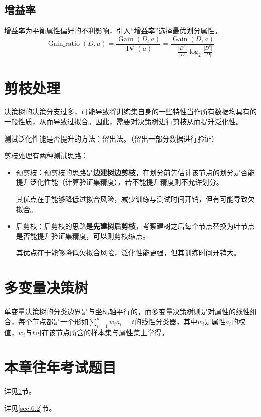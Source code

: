 \subsection{增益率}
增益率为平衡属性偏好的不利影响，引入“增益率”选择最优划分属性。
\[
\operatorname{Gain\_ ratio}(D, a)=\frac{\operatorname{Gain}(D, a)}{\operatorname{IV}(a)} = \frac{\operatorname{Gain}(D,a)}{-\frac{\left|D^{v}\right|}{|D|} \log _{2} \frac{\left|D^{v}\right|}{|D|}}
\]

\section{剪枝处理}\label{sec:6.3}
决策树的决策分支过多，可能导致将训练集自身的一些特性当作所有数据均具有的一般性质，从而导致过拟合。因此，需要对决策树进行剪枝从而提升泛化性。

测试泛化性能是否提升的方法：留出法。（留出一部分数据进行验证）

剪枝处理有两种测试思路：
\begin{itemize}
    \item 预剪枝：预剪枝的思路是\textbf{边建树边剪枝}，在划分前先估计该节点的划分是否能提升泛化性能（计算验证集精度），若不能提升精度则不允许划分。

    其优点在于能够降低过拟合风险，减少训练与测试时间开销，但有可能导致欠拟合。

    \item 后剪枝：后剪枝的思路是\textbf{先建树后剪枝}，考察建树之后每个节点替换为叶节点是否能提升验证集精度，可以则剪枝缩点。

    其优点在于能够降低欠拟合风险，泛化性能更强，但其训练时间开销大。
\end{itemize}

\section{多变量决策树}\label{sec:6.4}

单变量决策树的分类边界是与坐标轴平行的，而多变量决策树则是对属性的线性组合，每个节点都是一个形如$\sum_{i=1}^d w_i a_i=t$的线性分类器，其中$ w_i$是属性$a_i$的权值，$w_i$与$t$可在该节点所含的样本集与属性集上学得。

\section{本章往年考试题目}\label{sec:6.5}


详见\ref{sec:6.3}节。


详见\ref{sec:6.2}节。